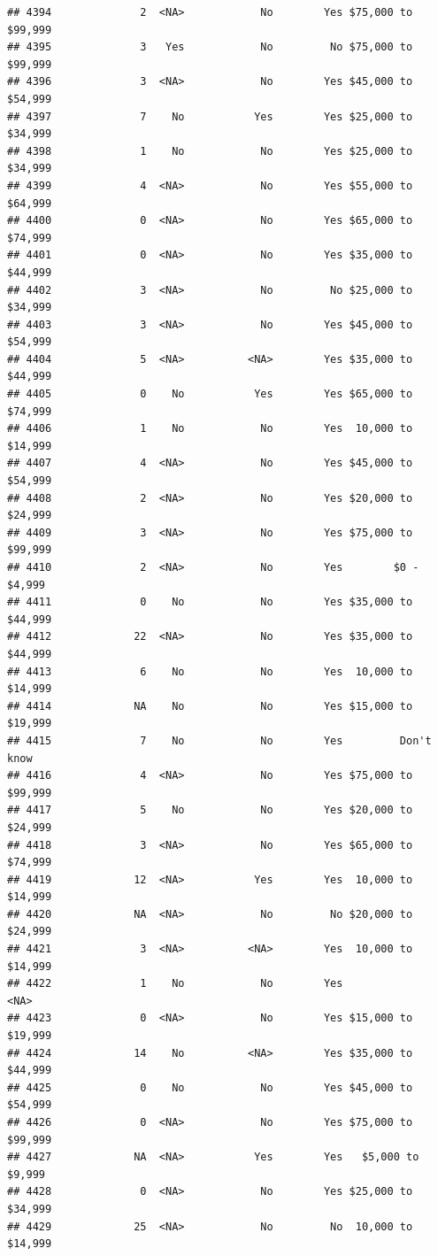 \documentclass[man]{apa6}
\begin{document}
\begin{verbatim}
## 4394              2  <NA>            No        Yes $75,000 to $99,999
## 4395              3   Yes            No         No $75,000 to $99,999
## 4396              3  <NA>            No        Yes $45,000 to $54,999
## 4397              7    No           Yes        Yes $25,000 to $34,999
## 4398              1    No            No        Yes $25,000 to $34,999
## 4399              4  <NA>            No        Yes $55,000 to $64,999
## 4400              0  <NA>            No        Yes $65,000 to $74,999
## 4401              0  <NA>            No        Yes $35,000 to $44,999
## 4402              3  <NA>            No         No $25,000 to $34,999
## 4403              3  <NA>            No        Yes $45,000 to $54,999
## 4404              5  <NA>          <NA>        Yes $35,000 to $44,999
## 4405              0    No           Yes        Yes $65,000 to $74,999
## 4406              1    No            No        Yes  10,000 to $14,999
## 4407              4  <NA>            No        Yes $45,000 to $54,999
## 4408              2  <NA>            No        Yes $20,000 to $24,999
## 4409              3  <NA>            No        Yes $75,000 to $99,999
## 4410              2  <NA>            No        Yes        $0 - $4,999
## 4411              0    No            No        Yes $35,000 to $44,999
## 4412             22  <NA>            No        Yes $35,000 to $44,999
## 4413              6    No            No        Yes  10,000 to $14,999
## 4414             NA    No            No        Yes $15,000 to $19,999
## 4415              7    No            No        Yes         Don't know
## 4416              4  <NA>            No        Yes $75,000 to $99,999
## 4417              5    No            No        Yes $20,000 to $24,999
## 4418              3  <NA>            No        Yes $65,000 to $74,999
## 4419             12  <NA>           Yes        Yes  10,000 to $14,999
## 4420             NA  <NA>            No         No $20,000 to $24,999
## 4421              3  <NA>          <NA>        Yes  10,000 to $14,999
## 4422              1    No            No        Yes               <NA>
## 4423              0  <NA>            No        Yes $15,000 to $19,999
## 4424             14    No          <NA>        Yes $35,000 to $44,999
## 4425              0    No            No        Yes $45,000 to $54,999
## 4426              0  <NA>            No        Yes $75,000 to $99,999
## 4427             NA  <NA>           Yes        Yes   $5,000 to $9,999
## 4428              0  <NA>            No        Yes $25,000 to $34,999
## 4429             25  <NA>            No         No  10,000 to $14,999

\end{verbatim}
\end{document}
